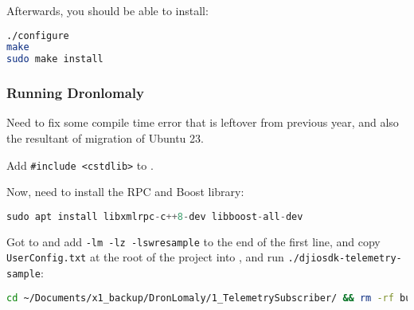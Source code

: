 Afterwards, you should be able to install:
\begin{lstlisting}[language=bash]
./configure
make
sudo make install
\end{lstlisting}

\subsubsection{Running Dronlomaly}

Need to fix some compile time error that is leftover from previous year, and also the resultant of migration of Ubuntu 23.

Add \texttt{\#include <cstdlib>} to .

Now, need to install the RPC and Boost library:
\begin{lstlisting}[language=C++]
sudo apt install libxmlrpc-c++8-dev libboost-all-dev
\end{lstlisting}

Got to  and add \texttt{-lm -lz -lswresample} to the end of the first line, and copy \texttt{UserConfig.txt} at the root of the project into , and run \texttt{./djiosdk-telemetry-sample}:
\begin{lstlisting}[language=bash]
cd ~/Documents/x1_backup/DronLomaly/1_TelemetrySubscriber/ && rm -rf build && mkdir build && cd build && cmake .. && make && cp ../../UserConfig.txt bin
\end{lstlisting}